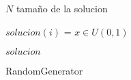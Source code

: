 \documentclass{article}
\begin{document}
\begin{algorithm}
\begin{algorithmic}[1]
    \REQUIRE $N$ tamaño de la solucion

	\STATE $solucion(i)$ = ${x \in U(0,1)}$
    \ENDFOR

    \RETURN $solucion$
\end{algorithmic}
\caption{RandomGenerator}
\end{algorithm}
\end{document}
